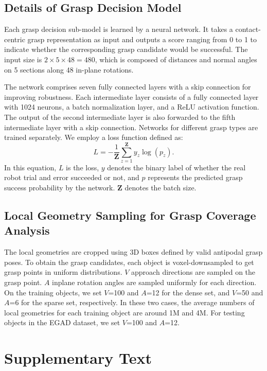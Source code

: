 \subsection*{Details of Grasp Decision Model}
Each grasp decision sub-model is learned by a neural network. It takes a contact-centric grasp representation as input and outputs a score ranging from 0 to 1 to indicate whether the corresponding grasp candidate would be successful. The input size is $2\times5\times48=480$, which is composed of distances and normal angles on 5 sections along 48 in-plane rotations.

The network comprises seven fully connected layers with a skip connection for improving robustness. Each intermediate layer consists of a fully connected layer with 1024 neurons, a batch normalization layer, and a ReLU activation function. The output of the second intermediate layer is also forwarded to the fifth intermediate layer with a skip connection. Networks for different grasp types are trained separately. We employ a loss function defined as: 
\begin{equation}\label{loss}
L = -\frac{1}{\mathbf{Z}}\sum_{z=1}^\mathbf{Z}y_{z}\log(p_{z}).
\end{equation}
In this equation, $L$ is the loss, $y$ denotes the binary label of whether the real robot trial and error succeeded or not, and $p$ represents the predicted grasp success probability by the network. $\mathbf{Z}$ denotes the batch size.

\subsection*{Local Geometry Sampling for Grasp Coverage Analysis}
The local geometries are cropped using 3D boxes defined by valid antipodal grasp poses. To obtain the grasp candidates, each object is voxel-downsampled to get grasp points in uniform distributions. $V$ approach directions are sampled on the grasp point. $A$ inplane rotation angles are sampled uniformly for each direction. On the training objects, we set $V$=100 and $A$=12 for the dense set, and $V$=50 and $A$=6 for the sparse set, respectively. In these two cases, the average numbers of local geometries for each training object are around 1M and 4M. For testing objects in the EGAD dataset, we set $V$=100 and $A$=12.

\section*{\Large \textbf{Supplementary Text}}

